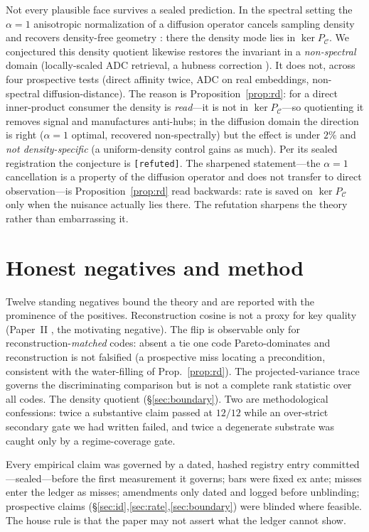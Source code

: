 \documentclass[11pt]{article}
\theoremstyle{definition}
\theoremstyle{remark}
\newcommand{\PC}{P_{\mathcal{C}}}
\begin{document}
Not every plausible face survives a sealed prediction. In the spectral setting the
$\alpha{=}1$ anisotropic normalization of a diffusion operator cancels sampling
density and recovers density-free geometry \cite{coifman2006}: there the density mode
lies in $\ker\PC$. We conjectured this density quotient likewise restores the
invariant in a \emph{non-spectral} domain (locally-scaled ADC retrieval, a hubness
correction \cite{radovanovic2010}). It does not, across four prospective tests
(direct affinity twice, ADC on real embeddings, non-spectral diffusion-distance).
The reason is Proposition~\ref{prop:rd}: for a direct inner-product consumer the
density is \emph{read}---it is not in $\ker\PC$---so quotienting it removes signal and
manufactures anti-hubs; in the diffusion domain the direction is right ($\alpha{=}1$
optimal, recovered non-spectrally) but the effect is under $2\%$ and \emph{not
density-specific} (a uniform-density control gains as much). Per its sealed
registration the conjecture is \texttt{[refuted]}. The sharpened statement---the
$\alpha{=}1$ cancellation is a property of the diffusion operator and does not
transfer to direct observation---is Proposition~\ref{prop:rd} read backwards: rate is
saved on $\ker\PC$ only when the nuisance actually lies there. The refutation
sharpens the theory rather than embarrassing it.

\section{Honest negatives and method}\label{sec:negatives}

Twelve standing negatives bound the theory and are reported with the prominence of
the positives. Reconstruction cosine is not a proxy for key quality (Paper~II
\cite{paper2}, the motivating negative). The flip is observable only for
reconstruction-\emph{matched} codes: absent a tie one code Pareto-dominates and
reconstruction is not falsified (a prospective miss locating a precondition,
consistent with the water-filling of Prop.~\ref{prop:rd}). The projected-variance
trace governs the discriminating comparison but is not a complete rank statistic over
all codes. The density quotient (\S\ref{sec:boundary}). Two are methodological
confessions: twice a substantive claim passed at $12/12$ while an over-strict
secondary gate we had written failed, and twice a degenerate substrate was caught
only by a regime-coverage gate.

Every empirical claim was governed by a dated, hashed registry entry
committed---sealed---before the first measurement it governs; bars were fixed ex
ante; misses enter the ledger as misses; amendments only dated and logged before
unblinding; prospective claims (\S\ref{sec:id},\ref{sec:rate},\ref{sec:boundary}) were
blinded where feasible. The house rule is that the paper may not assert what the
ledger cannot show.
\end{document}

